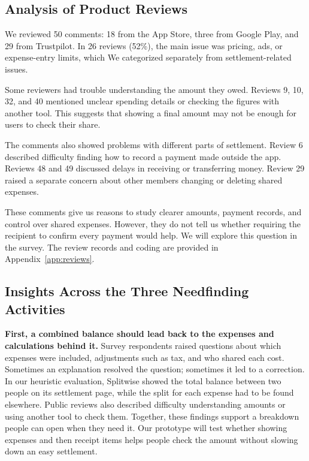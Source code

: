 \documentclass[letterpaper]{jdf}
\begin{document}
\subsection{Analysis of Product Reviews}

We reviewed 50 comments: 18 from the App Store, three from Google Play, and 29 from Trustpilot. In 26 reviews (52\%), the main issue was pricing, ads, or expense-entry limits, which We categorized separately from settlement-related issues.

Some reviewers had trouble understanding the amount they owed. Reviews 9, 10, 32, and 40 mentioned unclear spending details or checking the figures with another tool. This suggests that showing a final amount may not be enough for users to check their share.

The comments also showed problems with different parts of settlement. Review 6 described difficulty finding how to record a payment made outside the app. Reviews 48 and 49 discussed delays in receiving or 
transferring money. Review 29 raised a separate concern about other members changing or deleting shared expenses.

These comments give us reasons to study clearer amounts, payment records, and control over shared expenses. However, they do not tell us whether requiring the recipient to confirm every payment would help. We will explore this question in the survey. The review records and coding are provided in
Appendix~\ref{app:reviews}.

\subsection{Insights Across the Three Needfinding Activities}\label{insights-across-the-three-needfinding-activities}

\textbf{First, a combined balance should lead back to the expenses and calculations behind it.} Survey respondents raised questions about which expenses were included, adjustments such as tax, and who shared each cost. Sometimes an explanation resolved the question; sometimes it led to a correction. In our heuristic evaluation, Splitwise showed the total balance between two people on its settlement page, while the split for each expense had to be found elsewhere. Public reviews also described difficulty understanding amounts or using another tool to check them. Together, these findings support a breakdown people can open when they need it. Our prototype will test whether showing expenses and then receipt items helps people check the amount without slowing down an easy settlement.
\end{document}
